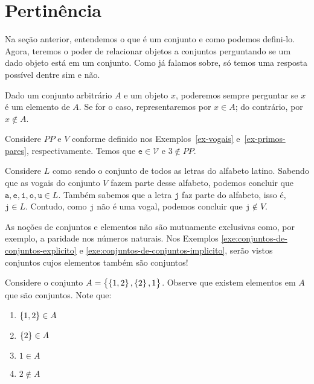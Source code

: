 \section{Pertinência}

Na seção anterior, entendemos o que é um conjunto e como podemos defini-lo.
Agora, teremos o poder de relacionar objetos a conjuntos perguntando se um dado objeto está em um conjunto.
Como já falamos sobre, só temos uma resposta possível dentre sim e não.

\begin{definition}
\label{def:in}
Dado um conjunto arbitrário $A$ e um objeto $x$,
poderemos sempre perguntar se $x$ é um elemento de $A$. Se for o caso, representaremos por $x \in A$; do contrário, por $x \notin A$.
\end{definition}

\begin{example}
Considere $PP$ e $V$ conforme definido nos Exemplos~\ref{ex-vogais} e~\ref{ex-primos-pares}, respectivamente. Temos que $\texttt{e} \in \mathcal{V}$ e $3 \notin PP$.
\end{example}

\begin{example}
Considere $L$ como sendo o conjunto de todos as letras do alfabeto latino.
Sabendo que as vogais do conjunto $V$ fazem parte desse alfabeto, podemos concluir que $\texttt{a}, \texttt{e}, \texttt{i}, \texttt{o}, \texttt{u} \in L$.
Também sabemos que a letra $\texttt{j}$ faz parte do alfabeto, isso é, $\texttt{j} \in L$.
Contudo, como $\texttt{j}$ não é uma vogal, podemos concluir que $\texttt{j} \notin V$.

\end{example}

As noções de conjuntos e elementos não são mutuamente exclusivas como, por exemplo, a paridade nos números naturais. 
Nos Exemplos \ref{exe:conjuntos-de-conjuntos-explicito} e \ref{exe:conjuntos-de-conjuntos-implicito}, serão vistos conjuntos cujos elementos também são conjuntos!

\begin{example}
\label{exe:conjuntos-de-conjuntos-explicito}
Considere o conjunto $A = \left\{ \left\{ 1,2\right\},\left\{ 2\right\}, 1\right\}$.
    Observe que existem elementos em $A$ que são conjuntos.
    Note que:
    \begin{enumerate}
        \item $\left\{ 1,2\right\} \in A$
        \item $\left\{ 2\right\} \in A$
        \item $1 \in A$
        \item $2 \notin A$
    \end{enumerate}
\end{example}

